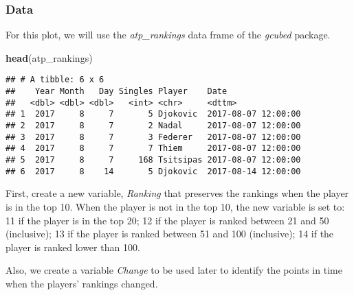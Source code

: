 \documentclass[]{book}
\newenvironment{Shaded}{\begin{snugshade}}{\end{snugshade}}
\newcommand{\DataTypeTok}[1]{\textcolor[rgb]{0.13,0.29,0.53}{#1}}
\newcommand{\DecValTok}[1]{\textcolor[rgb]{0.00,0.00,0.81}{#1}}
\newcommand{\KeywordTok}[1]{\textcolor[rgb]{0.13,0.29,0.53}{\textbf{#1}}}
\newcommand{\NormalTok}[1]{#1}
\newcommand{\OperatorTok}[1]{\textcolor[rgb]{0.81,0.36,0.00}{\textbf{#1}}}
\newcommand{\StringTok}[1]{\textcolor[rgb]{0.31,0.60,0.02}{#1}}
\begin{document}
\hypertarget{atpdata}{%
\subsubsection*{Data}\label{atpdata}}

For this plot, we will use the \emph{atp\_rankings} data frame of the \emph{gcubed} package.

\begin{Shaded}
\begin{Highlighting}[]
\KeywordTok{head}\NormalTok{(atp_rankings)}
\end{Highlighting}
\end{Shaded}

\begin{verbatim}
## # A tibble: 6 x 6
##    Year Month   Day Singles Player    Date               
##   <dbl> <dbl> <dbl>   <int> <chr>     <dttm>             
## 1  2017     8     7       5 Djokovic  2017-08-07 12:00:00
## 2  2017     8     7       2 Nadal     2017-08-07 12:00:00
## 3  2017     8     7       3 Federer   2017-08-07 12:00:00
## 4  2017     8     7       7 Thiem     2017-08-07 12:00:00
## 5  2017     8     7     168 Tsitsipas 2017-08-07 12:00:00
## 6  2017     8    14       5 Djokovic  2017-08-14 12:00:00
\end{verbatim}

First, create a new variable, \emph{Ranking} that preserves the rankings when the player is in the top 10. When the player is not in the top 10, the new variable is set to: 11 if the player is in the top 20; 12 if the player is ranked between 21 and 50 (inclusive); 13 if the player is ranked between 51 and 100 (inclusive); 14 if the player is ranked lower than 100.

Also, we create a variable \emph{Change} to be used later to identify the points in time when the players' rankings changed.

\begin{Shaded}
\end{Shaded}
\end{document}
